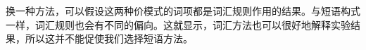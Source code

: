 \begin{exe}
\begin{xlist}[iv.]
\begin{exe}
\begin{xlist}[iv.]

换一种方法，可以假设这两种价模式的词项都是词汇规则作用的结果。与短语构式一样，词汇规则也会有不同的偏向。这就显示，词汇方法也可以很好地解释实验结果，所以这并不能促使我们选择短语方法。


\end{xlist}
\end{exe}
\end{xlist}
\end{exe}
